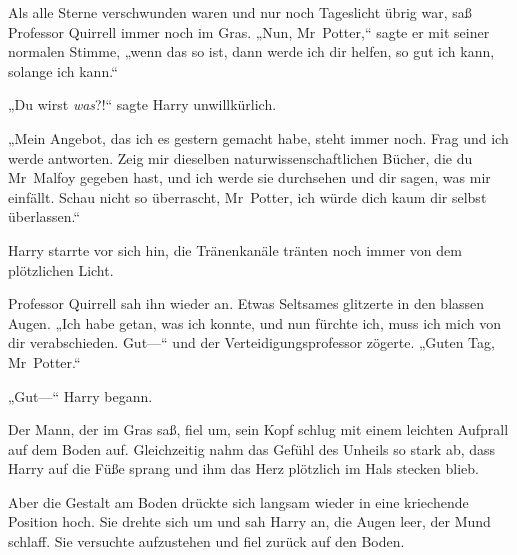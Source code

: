 Als alle Sterne verschwunden waren und nur noch Tageslicht übrig war, saß Professor Quirrell immer noch im Gras.
„Nun, Mr~Potter,“ sagte er mit seiner normalen Stimme, „wenn das so ist, dann werde ich dir helfen, so gut ich kann, solange ich kann.“

„Du wirst \emph{was}?!“ sagte Harry unwillkürlich.

„Mein Angebot, das ich es gestern gemacht habe, steht immer noch. Frag und ich werde antworten. Zeig mir dieselben naturwissenschaftlichen Bücher, die du Mr~Malfoy gegeben hast, und ich werde sie durchsehen und dir sagen, was mir einfällt. Schau nicht so überrascht, Mr~Potter, ich würde dich kaum dir selbst überlassen.“

Harry starrte vor sich hin, die Tränenkanäle tränten noch immer von dem plötzlichen Licht.

Professor Quirrell sah ihn wieder an. Etwas Seltsames glitzerte in den blassen Augen. „Ich habe getan, was ich konnte, und nun fürchte ich, muss ich mich von dir verabschieden. Gut—“ und der Verteidigungsprofessor zögerte. „Guten Tag, Mr~Potter.“

„Gut—“ Harry begann.

Der Mann, der im Gras saß, fiel um, sein Kopf schlug mit einem leichten Aufprall auf dem Boden auf. Gleichzeitig nahm das Gefühl des Unheils so stark ab, dass Harry auf die Füße sprang und ihm das Herz plötzlich im Hals stecken blieb.

Aber die Gestalt am Boden drückte sich langsam wieder in eine kriechende Position hoch. Sie drehte sich um und sah Harry an, die Augen leer, der Mund schlaff. Sie versuchte aufzustehen und fiel zurück auf den Boden.

